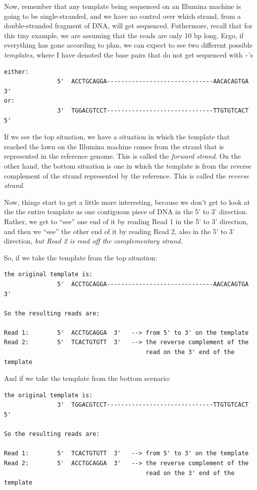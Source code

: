 \documentclass[]{krantz}
\begin{document}
Now, remember that any template being sequenced on an Illumina machine is
going to be single-stranded, and we have no control over which strand, from
a double-stranded fragment of DNA, will get sequenced. Futhermore, recall that
for this tiny example, we are assuming that the reads are only 10 bp long.
Ergo, if everything has gone according to plan, we can expect to see two
different possible \emph{templates}, where I have denoted the base pairs
that do not get sequenced with \texttt{-}'s

\begin{verbatim}
either:
               5'  ACCTGCAGGA------------------------------AACACAGTGA  3'
or:
               3'  TGGACGTCCT------------------------------TTGTGTCACT  5'
\end{verbatim}

If we see the top situation, we have a situation in which the template that reached
the lawn on the Illumina machine comes from the strand that is represented
in the reference genome. This is called the \emph{forward strand}. On the other hand,
the bottom situation is one in which the template is from the reverse complement
of the strand represented by the reference. This is called the \emph{reverse strand}.

Now, things start to get a little more interesting, because we don't get to look at the
the entire template as one contiguous piece of DNA in the 5' to 3' direction.
Rather, we get to ``see'' one end of it by reading Read 1 in the 5' to 3' direction,
and then we ``see'' the other end of it by reading Read 2, also in the 5' to 3' direction,
\emph{but Read 2 is read off the complementary strand}.

So, if we take the template from the top situation:

\begin{verbatim}
the original template is:
               5'  ACCTGCAGGA------------------------------AACACAGTGA  3'
               
So the resulting reads are:

Read 1:        5'  ACCTGCAGGA  3'   --> from 5' to 3' on the template
Read 2:        5'  TCACTGTGTT  3'   --> the reverse complement of the
                                        read on the 3' end of the template
\end{verbatim}

And if we take the template from the bottom scenario:

\begin{verbatim}
the original template is:
               3'  TGGACGTCCT------------------------------TTGTGTCACT  5'
               
So the resulting reads are:

Read 1:        5'  TCACTGTGTT  3'   --> from 5' to 3' on the template
Read 2:        5'  ACCTGCAGGA  3'   --> the reverse complement of the
                                        read on the 3' end of the template
\end{verbatim}
\end{document}
